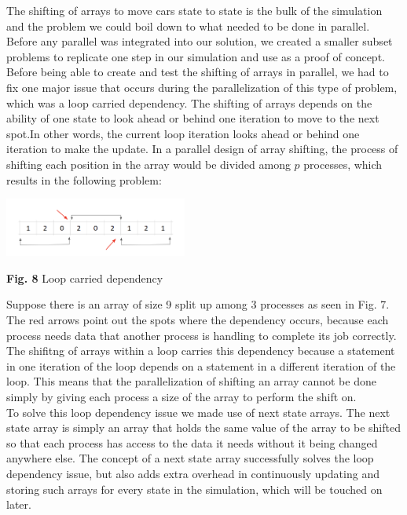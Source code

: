 \documentclass[conference]{IEEEtran}
\begin{document}
The shifting of arrays to move cars state to state is the bulk of the simulation and the problem we could boil down to what needed to be done in parallel. Before any parallel was integrated into our solution, we created a smaller subset problems to replicate one step in our simulation and use as a proof of concept.  \\

\hspace*{.2cm} Before being able to create and test the shifting of arrays in parallel, we had to fix one major issue that occurs during the parallelization of this type of problem, which was a loop carried dependency. The shifting of arrays depends on the ability of one state to look ahead or behind one iteration to move to the next spot.In other words, the current loop iteration looks ahead or behind one iteration to make the update. In a parallel design of array shifting, the process of shifting each position in the array would be divided among $p$ processes, which results in the following problem:

\includegraphics[width=0.45\textwidth]{images/dependency}
\begin{center}
	\textbf{Fig. 8} Loop carried dependency \\
\end{center}

Suppose there is an array of size 9 split up among 3 processes as seen in Fig. 7. The red arrows point out the spots where the dependency occurs, because each process needs data that another process is handling to complete its job correctly. The shifitng of arrays within a loop carries this dependency because a statement in one iteration of the loop depends on a statement in a different iteration of the loop. This means that the parallelization of shifting an array cannot be done simply by giving each process a size of the array to perform the shift on.  \\

\hspace*{.2cm} To solve this loop dependency issue we made use of next state arrays. The next state array is simply an array that holds the same value of the array to be shifted so that each process has access to the data it needs without it being changed anywhere else. The concept of a next state array successfully solves the loop dependency issue, but also adds extra overhead in continuously updating and storing such arrays for every state in the simulation, which will be touched on later. \\
\end{document}
